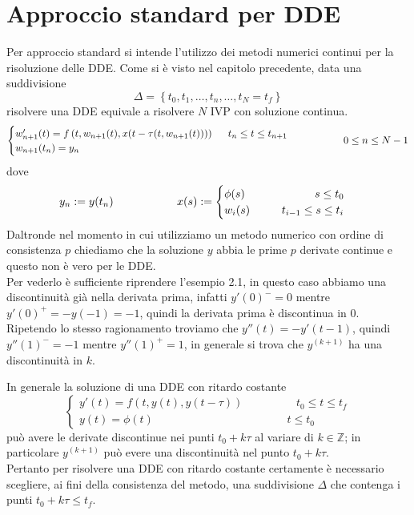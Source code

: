 \chapter{Approccio standard per DDE}
Per approccio standard si intende l'utilizzo dei metodi numerici continui per la risoluzione delle DDE.
Come si è visto nel capitolo precedente, data una suddivisione 
$$\Delta= \left \{ t_0, t_1, \dots , t_n , \dots , t_N = t_f \right \}$$
risolvere una DDE equivale a risolvere $N$ IVP con soluzione continua.
$$
\begin{cases}
 w_{n+1}'(t)= f \left(t, w_{n+1}(t), x(t-\tau(t,w_{n+1}(t))) \right)	\hspace{0.5cm}	t_n \le t \le t_{n+1}	\\
 w_{n+1}(t_n)=y_n
\end{cases} \hspace{1.5cm}
0 \le n \le N-1
$$
dove
$$
y_n:=y(t_n)	\hspace{2cm}
x(s):=
\begin{cases}
 \phi(s)	\hspace{2.2cm}	s \le t_0			\\
 w_{i}(s)	\hspace{1cm}	t_{i-1} \le s \le t_i 	
\end{cases}
$$
Daltronde nel momento in cui utilizziamo un metodo numerico con ordine di consistenza $p$ chiediamo che la soluzione $y$ abbia le prime 
$p$ derivate continue e questo non è vero per le DDE.\\
Per vederlo è sufficiente riprendere l'esempio 2.1, in questo caso abbiamo una discontinuità già nella derivata prima, infatti $y'(0)^-=0$ 
mentre $y'(0)^+=-y(-1)=-1$, quindi la derivata prima è discontinua in $0$. Ripetendo lo stesso ragionamento troviamo che $y''(t)=-y'(t-1)$, 
quindi $y''(1)^-=-1$ mentre $y''(1)^+=1$, in generale si trova che $y^{(k+1)}$ ha una discontinuità in $k$.

\begin{exm}
In generale la soluzione di una DDE con ritardo costante
$$
\begin{cases}
 y'(t) = f(t,y(t),y(t- \tau))		\hspace{2cm}	t_0 \le t \le t_f \\
 y(t)=\phi(t)				\hspace{5cm}	t \le t_0
\end{cases} 
$$
può avere le derivate discontinue nei punti $t_0 + k \tau$ al variare di $k \in \mathbb{Z}$;
 in particolare $y^{(k+1)}$ può evere una discontinuità nel punto $t_0+ k \tau$.\\[0.4cm]
Pertanto per risolvere una DDE con ritardo costante certamente è necessario scegliere, ai fini della consistenza del metodo, 
una suddivisione $\Delta$ che contenga i punti $t_0 + k \tau \le t_f$. 
\end{exm}

